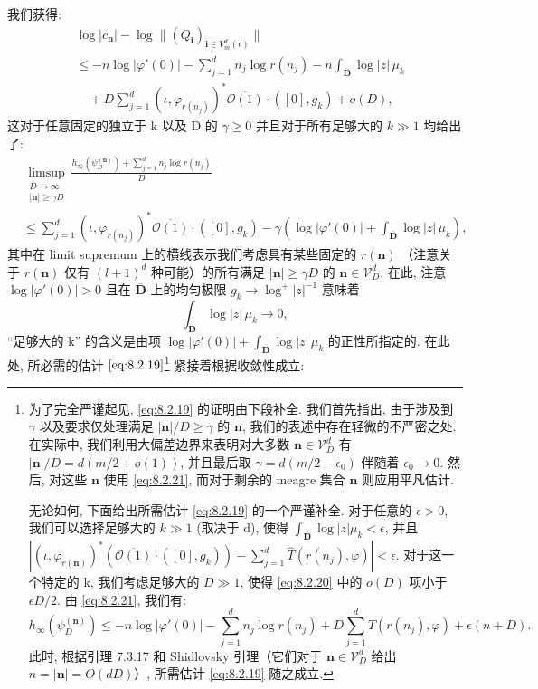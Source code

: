 我们获得:
\begin{equation}\label{eq:8.2.20}
\begin{aligned}
&\log |c_{\mathbf{n}}| - \log \|(Q_{\mathbf{i}})_{\mathbf{i} \in V_m^d(\epsilon)}\| \\
&\le -n \log |\varphi'(0)| - \sum_{j=1}^d n_j \log r(n_j) - n \int_{\overline{\mathbf{D}}} \log |z| \, \mu_k \\
&\quad + D \sum_{j=1}^d (\iota, \varphi_{r(n_j)})^* \overline{\mathcal{O}(1)} \cdot ([0], g_k) + o(D),
\end{aligned}
\end{equation}
这对于任意固定的独立于 k 以及 D 的 \(\gamma \geq 0\) 并且对于所有足够大的 \(k \gg 1\) 均给出了:
\begin{equation}\label{eq:8.2.21}
\begin{aligned}
&\limsup_{\substack{D \to \infty \\ |\mathbf{n}| \ge \gamma D}} \frac{h_{\infty}(\psi_D^{(\mathbf{n})}) + \sum_{j=1}^d n_j \log r(n_j)}{D} \\
&\le \sum_{j=1}^d (\iota, \varphi_{r(n_j)})^* \overline{\mathcal{O}(1)} \cdot ([0], g_k) - \gamma \left( \log |\varphi'(0)| + \int_{\overline{\mathbf{D}}} \log |z| \, \mu_k \right),
\end{aligned}
\end{equation}
其中在 limit supremum 上的横线表示我们考虑具有某些固定的 \(r(\mathbf{n})\) （注意关于 \(r(\mathbf{n})\) 仅有 \((l+1)^d\) 种可能）的所有满足 \(|\mathbf{n}| \geq \gamma D\) 的 \(\mathbf{n} \in \mathcal{V}_D^d\). 
在此, 注意 \(\log |\varphi'(0)| > 0\) 且在 \(\overline{\mathbf{D}}\) 上的均匀极限 \(g_k \to \log^+ |z|^{-1}\) 意味着
\[ \int_{\overline{\mathbf{D}}} \log |z| \, \mu_k \to 0, \]
“足够大的 k” 的含义是由项 \(\log |\varphi'(0)| + \int_{\overline{\mathbf{D}}} \log |z| \, \mu_k\) 的正性所指定的. 
在此处, 所必需的估计 \(\eqref{eq:8.2.19}\)\footnote{为了完全严谨起见, \eqref{eq:8.2.19} 的证明由下段补全. 我们首先指出, 由于涉及到 \(\gamma\) 以及要求仅处理满足 \(|\mathbf{n}|/D \ge \gamma\) 的 \(\mathbf{n}\), 我们的表述中存在轻微的不严密之处. 在实际中, 我们利用大偏差边界来表明对大多数 \(\mathbf{n} \in \mathcal{V}_D^d\) 有 \(|\mathbf{n}|/D = d(m/2 + o(1))\), 并且最后取 \(\gamma = d(m/2 - \epsilon_0)\) 伴随着 \(\epsilon_0 \to 0\). 然后, 对这些 \(\mathbf{n}\) 使用 \eqref{eq:8.2.21}, 而对于剩余的 meagre 集合 \(\mathbf{n}\) 则应用平凡估计.\par 无论如何, 下面给出所需估计 \eqref{eq:8.2.19} 的一个严谨补全. 对于任意的 \(\epsilon > 0\), 我们可以选择足够大的 \(k \gg 1\) (取决于 d), 使得 \(\int_{\overline{\mathbf{D}}} \log|z| \mu_k < \epsilon\), 并且 \(\left|(\iota,\varphi_{r(\mathbf{n})})^*\left(\overline{\mathcal{O}(1)}\cdot([0],g_k)\right) - \sum_{j=1}^d \widehat{T}(r(n_j),\varphi)\right| < \epsilon\). 对于这一个特定的 k, 我们考虑足够大的 \(D \gg 1\), 使得 \eqref{eq:8.2.20} 中的 \(o(D)\) 项小于 \(\epsilon D/2\). 由 \eqref{eq:8.2.21}, 我们有:
\[ h_{\infty}(\psi_D^{(\mathbf{n})}) \le -n \log |\varphi'(0)| - \sum_{j=1}^d n_j \log r(n_j) + D \sum_{j=1}^d \widehat{T}(r(n_j), \varphi) + \epsilon(n+D). \]
此时, 根据引理 7.3.17 和 Shidlovsky 引理（它们对于 \(\mathbf{n} \in \mathcal{V}_D^d\) 给出 \(n = |\mathbf{n}| = O(dD)\)）, 所需估计 \eqref{eq:8.2.19} 随之成立.} 紧接着根据收敛性成立:
